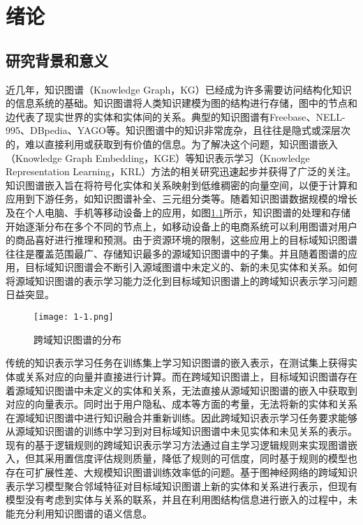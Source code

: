 \chapter{绪论}

\section{研究背景和意义}
近几年，知识图谱（Knowledge Graph，KG）已经成为许多需要访问结构化知识的信息系统的基础\cite{zou2020survey}。知识图谱将人类知识建模为图的结构进行存储，图中的节点和边代表了现实世界的实体和实体间的关系。典型的知识图谱有Freebase\cite{bollacker2008freebase}、NELL-995\cite{xiong2017deeppath}、DBpedia\cite{bizer2009dbpedia}、YAGO\cite{suchanek2007yago}等。知识图谱中的知识非常庞杂，且往往是隐式或深层次的，难以直接利用或获取到有价值的信息。为了解决这个问题，知识图谱嵌入（Knowledge Graph Embedding，KGE）等知识表示学习（Knowledge Representation Learning，KRL）方法的相关研究迅速起步并获得了广泛的关注。知识图谱嵌入旨在将符号化实体和关系映射到低维稠密的向量空间，以便于计算和应用到下游任务，如知识图谱补全、三元组分类等\cite{2021-eh}。随着知识图谱数据规模的增长及在个人电脑、手机等移动设备上的应用，如图\ref{fig:1-1}所示，知识图谱的处理和存储开始逐渐分布在多个不同的节点上，如移动设备上的电商系统可以利用图谱对用户的商品喜好进行推理和预测。由于资源环境的限制，这些应用上的目标域知识图谱往往是覆盖范围最广、存储知识最多的源域知识图谱中的子集。并且随着图谱的应用，目标域知识图谱会不断引入源域图谱中未定义的、新的未见实体和关系。如何将源域知识图谱的表示学习能力泛化到目标域知识图谱上的跨域知识表示学习问题日益突显。
\begin{figure}[h]
  \centering
  \texttt{[image: 1-1.png]}
  \caption{跨域知识图谱的分布}
  \label{fig:1-1}
\end{figure}

传统的知识表示学习任务在训练集上学习知识图谱的嵌入表示，在测试集上获得实体或关系对应的向量并直接进行计算。而在跨域知识图谱上，目标域知识图谱存在着源域知识图谱中未定义的实体和关系，无法直接从源域知识图谱的嵌入中获取到对应的向量表示。同时出于用户隐私、成本等方面的考量，无法将新的实体和关系在源域知识图谱中进行知识融合并重新训练。因此跨域知识表示学习任务要求能够从源域知识图谱的训练中学习到对目标域知识图谱中未见实体和未见关系的表示。现有的基于逻辑规则的跨域知识表示学习方法通过自主学习逻辑规则来实现图谱嵌入，但其采用置信度评估规则质量，降低了规则的可信度，同时基于规则的模型也存在可扩展性差、大规模知识图谱训练效率低的问题。基于图神经网络的跨域知识表示学习模型聚合邻域特征对目标域知识图谱上新的实体和关系进行表示，但现有模型没有考虑到实体与关系的联系，并且在利用图结构信息进行嵌入的过程中，未能充分利用知识图谱的语义信息。

